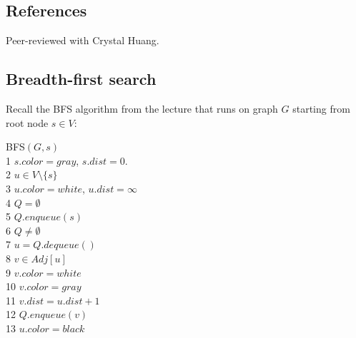 \def\lc{\left\lceil}   
\def\rc{\right\rceil}
\runningheadrule
\firstpageheadrule
\cfoot{}
\subsection*{References}
Peer-reviewed with Crystal Huang.

\subsection{Breadth-first search}
Recall the {\sc BFS} algorithm from the lecture that runs on graph $G$ starting from root node $s \in V$:
\begin{code}
    {\sc BFS}$(G,s)$\\
    1 \> $s.color = gray$, $s.dist = 0$. \\
    2 \> \For $u \in V \setminus \{s\}$ \\
    3 \> \> $u.color = white$, $u.dist = \infty$ \\
    4 \> $Q = \emptyset$ \\
    5 \> $Q.enqueue(s)$ \\
    6 \> \While $Q \neq \emptyset$ \\
    7 \> \> $u = Q.dequeue()$ \\
    8 \> \> \For $v \in Adj[u]$ \\
    9 \> \> \> \If $v.color = white$ \\
    10 \> \> \> \> $v.color = gray$ \\
    11 \> \> \> \> $v.dist = u.dist+1$ \\
    12 \> \> \> \> $Q.enqueue(v)$ \\
    13 \> \> $u.color = black$
\end{code}
\newpage
